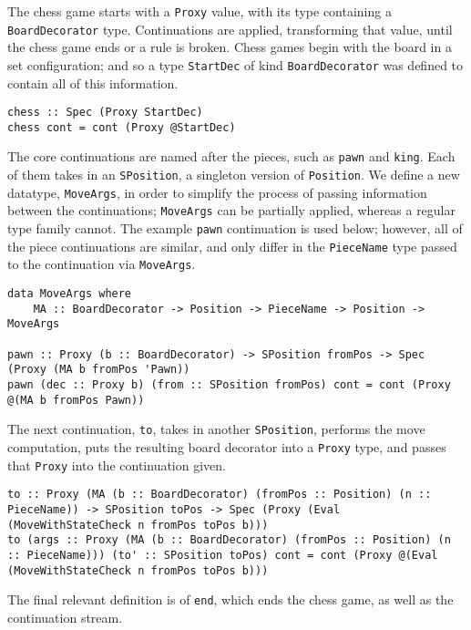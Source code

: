 \documentclass[12pt, a4paper, bibliography=totocnumbered]{scrartcl}
\begin{document}
The chess game starts with a \lstinline{Proxy} value, with its type containing a \lstinline{BoardDecorator} type. Continuations are applied, transforming that value, until the chess game ends or a rule is broken. Chess games begin with the board in a set configuration; and so a type \lstinline{StartDec} of kind \lstinline{BoardDecorator} was defined to contain all of this information.

\begin{lstlisting}
chess :: Spec (Proxy StartDec)
chess cont = cont (Proxy @StartDec)
\end{lstlisting}

The core continuations are named after the pieces, such as \lstinline{pawn} and \lstinline{king}. Each of them takes in an \lstinline{SPosition}, a singleton version of \lstinline{Position}. We define a new datatype, \lstinline{MoveArgs}, in order to simplify the process of passing information between the continuations; \lstinline{MoveArgs} can be partially applied, whereas a regular type family cannot. The example \lstinline{pawn} continuation is used below; however, all of the piece continuations are similar, and only differ in the \lstinline{PieceName} type passed to the continuation via \lstinline{MoveArgs}.

\begin{lstlisting}
data MoveArgs where
    MA :: BoardDecorator -> Position -> PieceName -> Position -> MoveArgs

pawn :: Proxy (b :: BoardDecorator) -> SPosition fromPos -> Spec (Proxy (MA b fromPos 'Pawn))
pawn (dec :: Proxy b) (from :: SPosition fromPos) cont = cont (Proxy @(MA b fromPos Pawn))
\end{lstlisting}

The next continuation, \lstinline{to}, takes in another \lstinline{SPosition}, performs the move computation, puts the resulting board decorator into a \lstinline{Proxy} type, and passes that \lstinline{Proxy} into the continuation given.

\begin{lstlisting}
to :: Proxy (MA (b :: BoardDecorator) (fromPos :: Position) (n :: PieceName)) -> SPosition toPos -> Spec (Proxy (Eval (MoveWithStateCheck n fromPos toPos b)))
to (args :: Proxy (MA (b :: BoardDecorator) (fromPos :: Position) (n :: PieceName))) (to' :: SPosition toPos) cont = cont (Proxy @(Eval (MoveWithStateCheck n fromPos toPos b)))
\end{lstlisting}

The final relevant definition is of \lstinline{end}, which ends the chess game, as well as the continuation stream.
\end{document}
